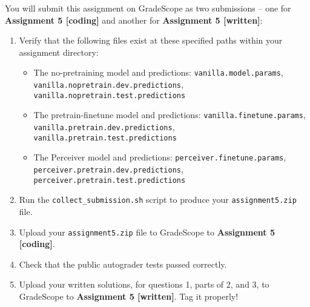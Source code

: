 \documentclass[answers]{exam}
\begin{document}
\normalsize
You will submit this assignment on GradeScope as two submissions -- one for \textbf{Assignment 5 [coding]} and another for \textbf{Assignment 5 [written]}:
\begin{enumerate}
    \item Verify that the following files exist at these specified paths within your assignment directory:
        \begin{itemize}
            \item The no-pretraining model and predictions: \texttt{vanilla.model.params}, \texttt{vanilla.nopretrain.dev.predictions},\\\texttt{vanilla.nopretrain.test.predictions}
            \item The pretrain-finetune model and predictions: \texttt{vanilla.finetune.params}, \texttt{vanilla.pretrain.dev.predictions}, \\ \texttt{vanilla.pretrain.test.predictions}
            \item The Perceiver model and predictions: \texttt{perceiver.finetune.params}, \texttt{perceiver.pretrain.dev.predictions}, \\ \texttt{perceiver.pretrain.test.predictions}
        \end{itemize}

    \item Run the \texttt{collect\_submission.sh} script to produce your \texttt{assignment5.zip} file.
    \item Upload your \texttt{assignment5.zip} file to GradeScope to \textbf{Assignment 5 [coding]}.
    \item Check that the public autograder tests passed correctly.
    \item Upload your written solutions, for questions 1, parts of 2, and 3, to GradeScope to \textbf{Assignment 5 [written]}. Tag it properly!
\end{enumerate}



\end{document}
